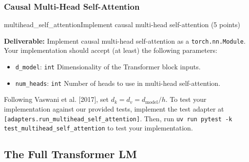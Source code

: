 \subsubsection{Causal Multi-Head Self-Attention}

\begin{problembox}{multihead\_self\_attention}{\newline Implement causal multi-head self-attention (5 points)}

    \textbf{Deliverable:} \quad Implement causal multi-head self-attention as a \texttt{torch.nn.Module}. Your implementation should accept (at least) the following parameters:

    \begin{itemize}[label={}, leftmargin=1.5em, itemsep=0.5em, parsep=0pt, topsep=0.5em]
        \item \texttt{d\_model}: \textcolor{green!50!black}{\texttt{int}} Dimensionality of the Transformer block inputs.
        \item \texttt{num\_heads}: \textcolor{green!50!black}{\texttt{int}} Number of heads to use in multi-head self-attention.
    \end{itemize}

    \vspace{0.5em}
    Following Vaswani et al. [2017], set $d_k = d_v = d_{\mathrm{model}}/h$. \newline To test your implementation against our provided tests, implement the test adapter at \textcolor{red!80!black}{\texttt{[adapters.run\_multihead\_self\_attention]}}. Then, run \texttt{uv run pytest -k test\_multihead\_self\_attention} to test your implementation.

\end{problembox}

\subsection{The Full Transformer LM}

